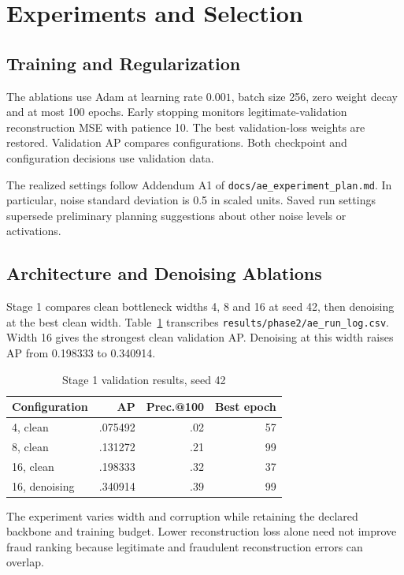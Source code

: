 \documentclass[conference]{IEEEtran}
\newcommand{\artifact}[1]{{\footnotesize\nolinkurl{#1}}}
\begin{document}
\section{Experiments and Selection}
\subsection{Training and Regularization}
The ablations use Adam at learning rate $0.001$, batch size 256, zero weight decay and at most 100 epochs. Early stopping monitors legitimate-validation reconstruction MSE with patience 10. The best validation-loss weights are restored. Validation AP compares configurations. Both checkpoint and configuration decisions use validation data.

The realized settings follow Addendum A1 of \artifact{docs/ae_experiment_plan.md}. In particular, noise standard deviation is 0.5 in scaled units. Saved run settings supersede preliminary planning suggestions about other noise levels or activations.

\subsection{Architecture and Denoising Ablations}
Stage 1 compares clean bottleneck widths 4, 8 and 16 at seed 42, then denoising at the best clean width. Table~\ref{tab:ablation} transcribes \artifact{results/phase2/ae_run_log.csv}. Width 16 gives the strongest clean validation AP. Denoising at this width raises AP from 0.198333 to 0.340914.

\begin{table}[!ht]
\caption{Stage 1 validation results, seed 42}\label{tab:ablation}
\centering\small
\begin{tabular}{lrrr}\toprule
Configuration & AP & Prec.@100 & Best epoch\\\midrule
4, clean & .075492 & .02 & 57\\
8, clean & .131272 & .21 & 99\\
16, clean & .198333 & .32 & 37\\
16, denoising & .340914 & .39 & 99\\\bottomrule
\end{tabular}
\end{table}

The experiment varies width and corruption while retaining the declared backbone and training budget. Lower reconstruction loss alone need not improve fraud ranking because legitimate and fraudulent reconstruction errors can overlap.
\end{document}
